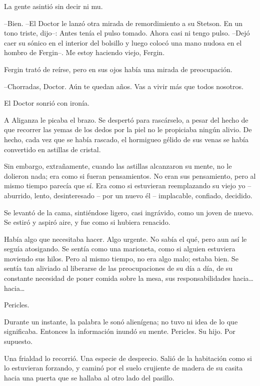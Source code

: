 La gente asintió sin decir ni mu. 

--Bien. --El Doctor le lanzó otra mirada de remordimiento a su Stetson. En un tono triste, dijo--: Antes tenía el pulso tomado. Ahora casi ni tengo pulso. --Dejó caer su sónico en el interior del bolsillo y luego colocó una mano nudosa en el hombro de Fergin--. Me estoy haciendo viejo, Fergin.

Fergin trató de reírse, pero en sus ojos había una mirada de preocupación.

--Chorradas, Doctor. Aún te quedan años. Vas a vivir más que todos nosotros.

El Doctor sonrió con ironía.



\mbox{}



\centerline{ \Huge *}



\mbox{}



A Aliganza le picaba el brazo. Se despertó para rascárselo, a pesar del hecho de que recorrer las yemas de los dedos por la piel no le propiciaba ningún alivio. De hecho, cada vez que se había rascado, el hormigueo gélido de sus venas se había convertido en astillas de cristal.

Sin embargo, extrañamente, cuando las astillas alcanzaron su mente, no le dolieron nada; era como si fueran pensamientos. No eran sus pensamiento, pero al mismo tiempo parecía que sí. Era como si estuvieran reemplazando su viejo yo – aburrido, lento, desinteresado – por un nuevo él – implacable, confiado, decidido.

Se levantó de la cama, sintiéndose ligero, casi ingrávido, como un joven de nuevo. Se estiró y aspiró aire, y fue como si hubiera renacido.

Había algo que necesitaba hacer. Algo urgente. No sabía el qué, pero aun así le seguía atosigando. Se sentía como una marioneta, como si alguien estuviera moviendo sus hilos. Pero al mismo tiempo, no era algo malo; estaba bien. Se sentía tan aliviado al liberarse de las preocupaciones de su día a día, de su constante necesidad de poner comida sobre la mesa, sus responsabilidades hacia… hacia…

Pericles.

Durante un instante, la palabra le sonó alienígena; no tuvo ni idea de lo que significaba. Entonces la información inundó su mente. Pericles. Su hijo. Por supuesto.

Una frialdad lo recorrió. Una especie de desprecio. Salió de la habitación como si lo estuvieran forzando, y caminó por el suelo crujiente de madera de su casita hacia una puerta que se hallaba al otro lado del pasillo.

